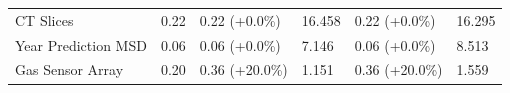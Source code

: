 \documentclass{article}
\begin{document}
\begin{table}[h]
\begin{tabular}{@{}llllll@{}}
CT Slices   & 0.22                              & 0.22 (+0.0\%)                                   & 16.458                                  & 0.22 (+0.0\%)                                   & 16.295                                  \\
Year Prediction MSD   & 0.06                              & 0.06 (+0.0\%)                                   & 7.146                                  & 0.06 (+0.0\%)                                   & 8.513                                  \\
Gas Sensor Array      & 0.20                              & 0.36 (+20.0\%)                                  & 1.151                                  & 0.36 (+20.0\%)                                  & 1.559                                  \\ \bottomrule
\end{tabular}\\
\end{table}
\end{document}
